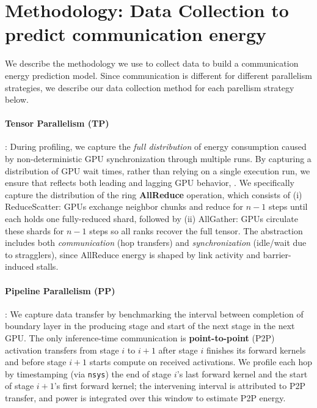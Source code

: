 \section{Methodology: Data Collection to predict communication energy}
\label{app:data-collection-parallel}
We describe the methodology we use to collect data to build a communication energy prediction model. Since communication is different for different parallelism strategies, we describe our data collection method for each parellism strategy below.

\paragraph{Tensor Parallelism (TP)}: During profiling, we capture the \emph{full distribution} of energy consumption caused by non-deterministic GPU synchronization through multiple runs. 
  By capturing a distribution of GPU wait times, rather than relying on a single execution run, we ensure that \sys{} reflects both leading and lagging GPU behavior, .
  We specifically capture the distribution of 
  the ring \textbf{AllReduce} operation, which consists of (i) ReduceScatter: GPUs exchange neighbor chunks and reduce for $n{-}1$ steps until each holds one fully-reduced shard, followed by (ii) AllGather: GPUs circulate these shards for $n{-}1$ steps so all ranks recover the full tensor. 
  The abstraction includes both \emph{communication} (hop transfers) and \emph{synchronization} (idle/wait due to stragglers), since AllReduce energy is shaped by link activity and barrier-induced stalls.

\paragraph{Pipeline Parallelism (PP)}: We capture data transfer by benchmarking the interval between completion of boundary layer in the producing stage and start of the next stage in the next GPU. 
    The only inference-time communication is \textbf{point-to-point} (P2P) activation transfers from stage $i$ to $i{+}1$ after stage $i$ finishes its forward kernels and before stage $i{+}1$ starts compute on received activations. 
    We profile each hop by timestamping (via \texttt{nsys}) the end of stage $i$’s last forward kernel and the start of stage $i{+}1$’s first forward kernel; the intervening interval is attributed to P2P transfer, and power is integrated over this window to estimate P2P energy.

